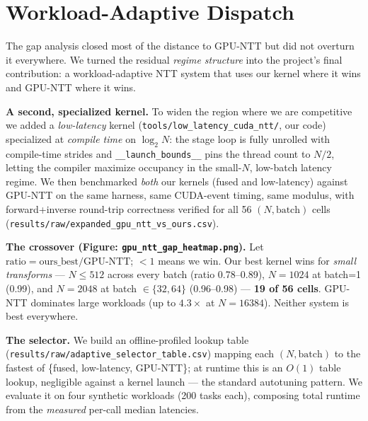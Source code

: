 \documentclass[11pt,a4paper]{article}
\begin{document}
\section{Workload-Adaptive Dispatch}
\label{sec:adaptive}

The gap analysis closed most of the distance to GPU-NTT but did not overturn it everywhere. We
turned the residual \emph{regime structure} into the project's final contribution: a
workload-adaptive NTT system that uses our kernel where it wins and GPU-NTT where it wins.

\textbf{A second, specialized kernel.} To widen the region where we are competitive we added a
\emph{low-latency} kernel (\texttt{tools/low\_latency\_cuda\_ntt/}, our code) specialized at
\emph{compile time} on $\log_2 N$: the stage loop is fully unrolled with compile-time strides and
\verb|__launch_bounds__| pins the thread count to $N/2$, letting the compiler maximize occupancy
in the small-$N$, low-batch latency regime. We then benchmarked \emph{both} our kernels (fused and
low-latency) against GPU-NTT on the same harness, same CUDA-event timing, same modulus, with
forward+inverse round-trip correctness verified for all 56 $(N,\text{batch})$ cells
(\texttt{results/raw/expanded\_gpu\_ntt\_vs\_ours.csv}).

\textbf{The crossover (Figure: \texttt{gpu\_ntt\_gap\_heatmap.png}).} Let
$\text{ratio} = \text{ours\_best} / \text{GPU-NTT}$; $<1$ means we win. Our best kernel wins for
\emph{small transforms} --- $N\le 512$ across every batch (ratio 0.78--0.89), $N=1024$ at batch=1
(0.99), and $N=2048$ at batch $\in\{32,64\}$ (0.96--0.98) --- \textbf{19 of 56 cells}. GPU-NTT
dominates large workloads (up to $4.3\times$ at $N=16384$). Neither system is best everywhere.

\textbf{The selector.} We build an offline-profiled lookup table
(\texttt{results/raw/adaptive\_selector\_table.csv}) mapping each $(N,\text{batch})$ to the fastest
of \{fused, low-latency, GPU-NTT\}; at runtime this is an $O(1)$ table lookup, negligible against a
kernel launch --- the standard autotuning pattern. We evaluate it on four synthetic workloads (200
tasks each), composing total runtime from the \emph{measured} per-call median latencies.
\end{document}
